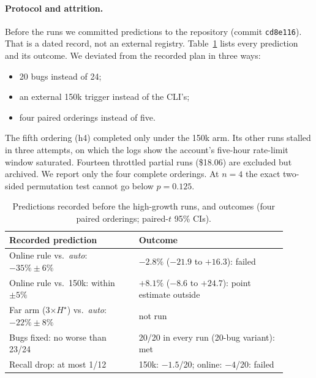 \documentclass[11pt]{article}
\begin{document}
\paragraph{Protocol and attrition.} Before the runs we committed predictions to the repository (commit \texttt{cd8e116}). That is a dated record, not an external registry. Table~\ref{tab:prereg} lists every prediction and its outcome. We deviated from the recorded plan in three ways:
\begin{itemize}
\item 20 bugs instead of 24;
\item an external 150k trigger instead of the CLI's;
\item four paired orderings instead of five.
\end{itemize}
The fifth ordering (h4) completed only under the 150k arm. Its other runs stalled in three attempts, on which the logs show the account's five-hour rate-limit window saturated. Fourteen throttled partial runs (\$18.06) are excluded but archived. We report only the four complete orderings. At $n=4$ the exact two-sided permutation test cannot go below $p=0.125$.

\begin{table}[t]
\centering
\small
\caption{Predictions recorded before the high-growth runs, and outcomes (four paired orderings; paired-$t$ 95\% CIs).}
\label{tab:prereg}
\begin{tabular}{p{0.42\linewidth}p{0.48\linewidth}}
\toprule
Recorded prediction & Outcome\\
\midrule
Online rule vs.\ \emph{auto}: $-35\%\pm6\%$ & $-2.8\%$ ($-21.9$ to $+16.3$): failed\\
Online rule vs.\ 150k: within $\pm5\%$ & $+8.1\%$ ($-8.6$ to $+24.7$): point estimate outside\\
Far arm (3$\times H^\star$) vs.\ \emph{auto}: $-22\%\pm8\%$ & not run\\
Bugs fixed: no worse than 23/24 & 20/20 in every run (20-bug variant): met\\
Recall drop: at most 1/12 & 150k: $-1.5$/20; online: $-4$/20: failed\\
\bottomrule
\end{tabular}
\end{table}
\end{document}
